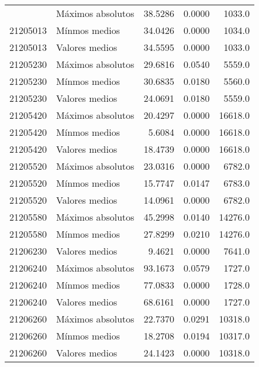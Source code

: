 \begin{longtable}{llrrr}
\bottomrule
\endlastfoot
 21205013 &  Máximos absolutos &       38.5286 &         0.0000 &          1033.0 \\
 21205013 &      Mínmos medios &       34.0426 &         0.0000 &          1034.0 \\
 21205013 &     Valores medios &       34.5595 &         0.0000 &          1033.0 \\
 21205230 &  Máximos absolutos &       29.6816 &         0.0540 &          5559.0 \\
 21205230 &      Mínmos medios &       30.6835 &         0.0180 &          5560.0 \\
 21205230 &     Valores medios &       24.0691 &         0.0180 &          5559.0 \\
 21205420 &  Máximos absolutos &       20.4297 &         0.0000 &         16618.0 \\
 21205420 &      Mínmos medios &        5.6084 &         0.0000 &         16618.0 \\
 21205420 &     Valores medios &       18.4739 &         0.0000 &         16618.0 \\
 21205520 &  Máximos absolutos &       23.0316 &         0.0000 &          6782.0 \\
 21205520 &      Mínmos medios &       15.7747 &         0.0147 &          6783.0 \\
 21205520 &     Valores medios &       14.0961 &         0.0000 &          6782.0 \\
 21205580 &  Máximos absolutos &       45.2998 &         0.0140 &         14276.0 \\
 21205580 &      Mínmos medios &       27.8299 &         0.0210 &         14276.0 \\
 21206230 &     Valores medios &        9.4621 &         0.0000 &          7641.0 \\
 21206240 &  Máximos absolutos &       93.1673 &         0.0579 &          1727.0 \\
 21206240 &      Mínmos medios &       77.0833 &         0.0000 &          1728.0 \\
 21206240 &     Valores medios &       68.6161 &         0.0000 &          1727.0 \\
 21206260 &  Máximos absolutos &       22.7370 &         0.0291 &         10318.0 \\
 21206260 &      Mínmos medios &       18.2708 &         0.0194 &         10317.0 \\
 21206260 &     Valores medios &       24.1423 &         0.0000 &         10318.0 \\

\end{longtable}
